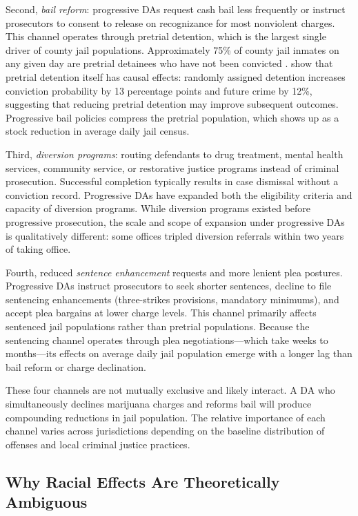 \documentclass[12pt]{article}
\begin{document}
Second, \textit{bail reform}: progressive DAs request cash bail less frequently or instruct prosecutors to consent to release on recognizance for most nonviolent charges. This channel operates through pretrial detention, which is the largest single driver of county jail populations. Approximately 75\% of county jail inmates on any given day are pretrial detainees who have not been convicted \citep{vera2024incarceration}. \citet{dobbie2018effects} show that pretrial detention itself has causal effects: randomly assigned detention increases conviction probability by 13 percentage points and future crime by 12\%, suggesting that reducing pretrial detention may improve subsequent outcomes. Progressive bail policies compress the pretrial population, which shows up as a stock reduction in average daily jail census.

Third, \textit{diversion programs}: routing defendants to drug treatment, mental health services, community service, or restorative justice programs instead of criminal prosecution. Successful completion typically results in case dismissal without a conviction record. Progressive DAs have expanded both the eligibility criteria and capacity of diversion programs. While diversion programs existed before progressive prosecution, the scale and scope of expansion under progressive DAs is qualitatively different: some offices tripled diversion referrals within two years of taking office.

Fourth, reduced \textit{sentence enhancement} requests and more lenient plea postures. Progressive DAs instruct prosecutors to seek shorter sentences, decline to file sentencing enhancements (three-strikes provisions, mandatory minimums), and accept plea bargains at lower charge levels. This channel primarily affects sentenced jail populations rather than pretrial populations. Because the sentencing channel operates through plea negotiations---which take weeks to months---its effects on average daily jail population emerge with a longer lag than bail reform or charge declination.

These four channels are not mutually exclusive and likely interact. A DA who simultaneously declines marijuana charges and reforms bail will produce compounding reductions in jail population. The relative importance of each channel varies across jurisdictions depending on the baseline distribution of offenses and local criminal justice practices.

\subsection{Why Racial Effects Are Theoretically Ambiguous}
\end{document}
